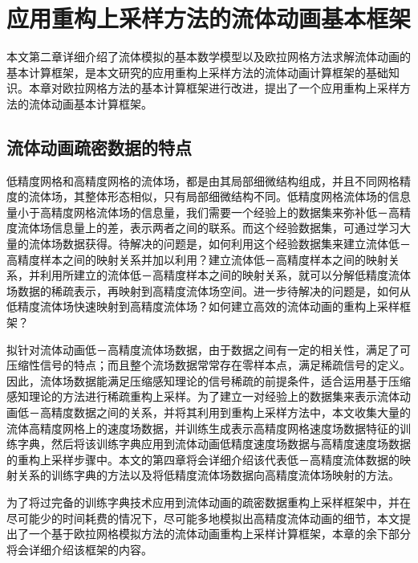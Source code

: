 
\chapter{应用重构上采样方法的流体动画基本框架}

本文第二章详细介绍了流体模拟的基本数学模型以及欧拉网格方法求解流体动画的基本计算框架，是本文研究的应用重构上采样方法的流体动画计算框架的基础知识。本章对欧拉网格方法的基本计算框架进行改进，提出了一个应用重构上采样方法的流体动画基本计算框架。

\section{流体动画疏密数据的特点}

低精度网格和高精度网格的流体场，都是由其局部细微结构组成，并且不同网格精度的流体场，其整体形态相似，只有局部细微结构不同。低精度网格流体场的信息量小于高精度网格流体场的信息量，我们需要一个经验上的数据集来弥补低－高精度流体场信息量上的差，表示两者之间的联系。而这个经验数据集，可通过学习大量的流体场数据获得。待解决的问题是，如何利用这个经验数据集来建立流体低－高精度样本之间的映射关系并加以利用？建立流体低－高精度样本之间的映射关系，并利用所建立的流体低－高精度样本之间的映射关系，就可以分解低精度流体场数据的稀疏表示，再映射到高精度流体场空间。进一步待解决的问题是，如何从低精度流体场快速映射到高精度流体场？如何建立高效的流体动画的重构上采样框架？

拟针对流体动画低－高精度流体场数据，由于数据之间有一定的相关性，满足了可压缩性信号的特点；而且整个流场数据常常存在零样本点，满足稀疏信号的定义。因此，流体场数据能满足压缩感知理论的信号稀疏的前提条件，适合运用基于压缩感知理论的方法进行稀疏重构上采样。为了建立一对经验上的数据集来表示流体动画低－高精度数据之间的关系，并将其利用到重构上采样方法中，本文收集大量的流体高精度网格上的速度场数据，并训练生成表示高精度网格速度场数据特征的训练字典，然后将该训练字典应用到流体动画低精度速度场数据与高精度速度场数据的重构上采样步骤中。本文的第四章将会详细介绍该代表低－高精度流体数据的映射关系的训练字典的方法以及将低精度流体场数据向高精度流体场映射的方法。

为了将过完备的训练字典技术应用到流体动画的疏密数据重构上采样框架中，并在尽可能少的时间耗费的情况下，尽可能多地模拟出高精度流体动画的细节，本文提出了一个基于欧拉网格模拟方法的流体动画重构上采样计算框架，本章的余下部分将会详细介绍该框架的内容。

